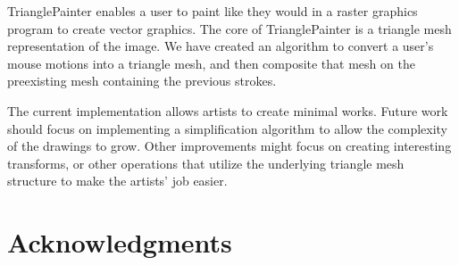 \documentclass[conference]{acmsiggraph}
\begin{document}
TrianglePainter enables a user to paint like they would in a raster graphics program 
to create vector graphics. The core of TrianglePainter is a triangle mesh representation of the image.
We have created an algorithm to convert a user's mouse motions into a triangle mesh, and then composite
that mesh on the preexisting mesh containing the previous strokes.

The current implementation allows artists to create minimal works. Future work should focus on
implementing a simplification algorithm to allow the complexity of the drawings to grow. Other
improvements might focus on creating interesting transforms, or other operations that utilize
the underlying triangle mesh structure to make the artists' job easier.


\section*{Acknowledgments}



\end{document}
